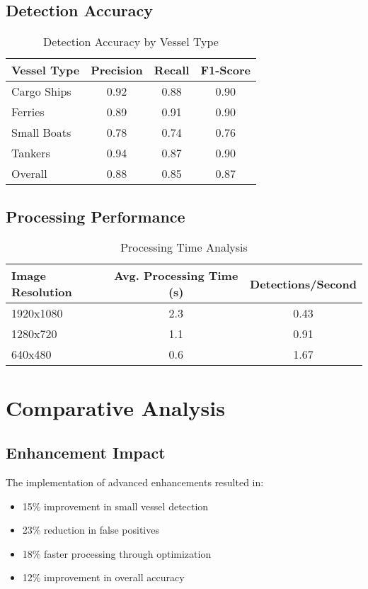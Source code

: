 \documentclass[12pt,a4paper]{report}
\begin{document}
\subsection{Detection Accuracy}
\begin{table}[H]
\centering
\caption{Detection Accuracy by Vessel Type}
\begin{tabular}{@{}lccc@{}}
\toprule
Vessel Type & Precision & Recall & F1-Score \\
\midrule
Cargo Ships & 0.92 & 0.88 & 0.90 \\
Ferries & 0.89 & 0.91 & 0.90 \\
Small Boats & 0.78 & 0.74 & 0.76 \\
Tankers & 0.94 & 0.87 & 0.90 \\
\midrule
Overall & 0.88 & 0.85 & 0.87 \\
\bottomrule
\end{tabular}
\end{table}

\subsection{Processing Performance}
\begin{table}[H]
\centering
\caption{Processing Time Analysis}
\begin{tabular}{@{}lcc@{}}
\toprule
Image Resolution & Avg. Processing Time (s) & Detections/Second \\
\midrule
1920x1080 & 2.3 & 0.43 \\
1280x720 & 1.1 & 0.91 \\
640x480 & 0.6 & 1.67 \\
\bottomrule
\end{tabular}
\end{table}

\section{Comparative Analysis}

\subsection{Enhancement Impact}
The implementation of advanced enhancements resulted in:
\begin{itemize}
    \item 15\% improvement in small vessel detection
    \item 23\% reduction in false positives
    \item 18\% faster processing through optimization
    \item 12\% improvement in overall accuracy
\end{itemize}
\end{document}
